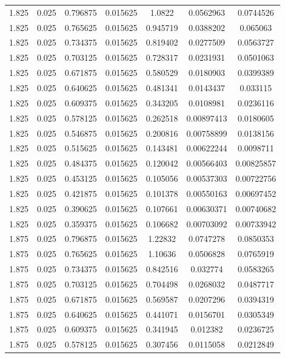 \begin{flushleft}
\begin{longtable}{ccccccc}
1.825 & 0.025 & 0.796875 & 0.015625 & 1.0822 & 0.0562963 & 0.0744526  \\ 
1.825 & 0.025 & 0.765625 & 0.015625 & 0.945719 & 0.0388202 & 0.065063  \\ 
1.825 & 0.025 & 0.734375 & 0.015625 & 0.819402 & 0.0277509 & 0.0563727  \\ 
1.825 & 0.025 & 0.703125 & 0.015625 & 0.728317 & 0.0231931 & 0.0501063  \\ 
1.825 & 0.025 & 0.671875 & 0.015625 & 0.580529 & 0.0180903 & 0.0399389  \\ 
1.825 & 0.025 & 0.640625 & 0.015625 & 0.481341 & 0.0143437 & 0.033115  \\ 
1.825 & 0.025 & 0.609375 & 0.015625 & 0.343205 & 0.0108981 & 0.0236116  \\ 
1.825 & 0.025 & 0.578125 & 0.015625 & 0.262518 & 0.00897413 & 0.0180605  \\ 
1.825 & 0.025 & 0.546875 & 0.015625 & 0.200816 & 0.00758899 & 0.0138156  \\ 
1.825 & 0.025 & 0.515625 & 0.015625 & 0.143481 & 0.00622244 & 0.0098711  \\ 
1.825 & 0.025 & 0.484375 & 0.015625 & 0.120042 & 0.00566403 & 0.00825857  \\ 
1.825 & 0.025 & 0.453125 & 0.015625 & 0.105056 & 0.00537303 & 0.00722756  \\ 
1.825 & 0.025 & 0.421875 & 0.015625 & 0.101378 & 0.00550163 & 0.00697452  \\ 
1.825 & 0.025 & 0.390625 & 0.015625 & 0.107661 & 0.00630371 & 0.00740682  \\ 
1.825 & 0.025 & 0.359375 & 0.015625 & 0.106682 & 0.00703092 & 0.00733942  \\ 
1.875 & 0.025 & 0.796875 & 0.015625 & 1.22832 & 0.0747278 & 0.0850353  \\ 
1.875 & 0.025 & 0.765625 & 0.015625 & 1.10636 & 0.0506828 & 0.0765919  \\ 
1.875 & 0.025 & 0.734375 & 0.015625 & 0.842516 & 0.032774 & 0.0583265  \\ 
1.875 & 0.025 & 0.703125 & 0.015625 & 0.704498 & 0.0268032 & 0.0487717  \\ 
1.875 & 0.025 & 0.671875 & 0.015625 & 0.569587 & 0.0207296 & 0.0394319  \\ 
1.875 & 0.025 & 0.640625 & 0.015625 & 0.441071 & 0.0156701 & 0.0305349  \\ 
1.875 & 0.025 & 0.609375 & 0.015625 & 0.341945 & 0.012382 & 0.0236725  \\ 
1.875 & 0.025 & 0.578125 & 0.015625 & 0.307456 & 0.0115058 & 0.0212849  \\ 

\end{longtable}
\end{flushleft}
